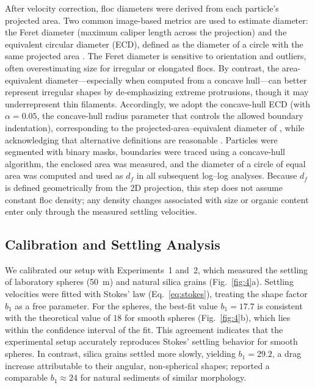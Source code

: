 \documentclass{agujournal2019}
\providecommand{\DIFdel}[1]{{\protect\color{red}\sout{#1}}} %
\providecommand{\DIFdelbegin}{\protect\color{red}} %
\providecommand{\DIFdelend}{\protect\color{black}} %
\newcommand{\DIFscaledelfig}{0.5}
\newlength{\DIFdelgraphicswidth} %
\newlength{\DIFdelgraphicsheight} %
\newcommand{\DIFdelincludegraphics}[2][]{%
\sbox{\DIFdelgraphicsbox}{\DIFOincludegraphics[#1]{#2}}%
\settoboxwidth{\DIFdelgraphicswidth}{\DIFdelgraphicsbox} %
\settoboxtotalheight{\DIFdelgraphicsheight}{\DIFdelgraphicsbox} %
\scalebox{\DIFscaledelfig}{%
\parbox[b]{\DIFdelgraphicswidth}{\usebox{\DIFdelgraphicsbox}\\[-\baselineskip] \rule{\DIFdelgraphicswidth}{0em}}\llap{\resizebox{\DIFdelgraphicswidth}{\DIFdelgraphicsheight}{%
\setlength{\unitlength}{\DIFdelgraphicswidth}%
\begin{picture}(1,1)%
\thicklines\linethickness{2pt} %
{\color[rgb]{1,0,0}\put(0,0){\framebox(1,1){}}}%
{\color[rgb]{1,0,0}\put(0,0){\line( 1,1){1}}}%
{\color[rgb]{1,0,0}\put(0,1){\line(1,-1){1}}}%
\end{picture}%
}\hspace*{3pt}}} %
} %
\DeclareRobustCommand{\DIFdelbegin}{\DIFOdelbegin \let\includegraphics\DIFdelincludegraphics} %
\DeclareRobustCommand{\DIFdelend}{\DIFOaddend \let\includegraphics\DIFOincludegraphics} %
\begin{document}
After velocity correction, floc diameters were derived from each particle's projected area. Two common image-based metrics are used to estimate diameter: the Feret diameter (maximum caliper length across the projection) and the equivalent circular diameter (ECD), defined as the diameter of a circle with the same projected area \cite{jarvis2005measuring, smith2015image}. The Feret diameter is sensitive to orientation and outliers, often overestimating size for irregular or elongated flocs. By contrast, the area-equivalent diameter---especially when computed from a concave hull---can better represent irregular shapes by de-emphasizing extreme protrusions, though it may underrepresent thin filaments. Accordingly, we adopt the concave-hull ECD (with $\alpha = 0.05$, the concave-hull radius parameter that controls the allowed boundary indentation), corresponding to the projected-area--equivalent diameter of , while acknowledging that alternative definitions are reasonable \cite{jarvis2005measuring}. Particles were segmented with binary masks, boundaries were traced using a concave-hull algorithm, the enclosed area was measured, and the diameter of a circle of equal area was computed and used as \(d_f\) in all subsequent log--log analyses. Because $d_f$ is defined geometrically from the 2D projection, this step does not assume constant floc density; any density changes associated with size or organic content enter only through the measured settling velocities.

\subsection{Calibration and Settling \DIFdelbegin \DIFdel{Behavior }\DIFdelend Analysis}

We calibrated our setup with Experiments~1 and~2, which measured the settling of laboratory spheres (50~\textmu m) and natural silica grains (Fig.~\ref{fig:4}a). Settling velocities were fitted with Stokes' law (Eq.~\eqref{eq:stokes}), treating the shape factor $b_1$ as a free parameter. For the spheres, the best-fit value $b_1 = 17.7$ is consistent with the theoretical value of $18$ for smooth spheres (Fig.~\ref{fig:4}b), which lies within the confidence interval of the fit. This agreement indicates that the experimental setup accurately reproduces Stokes' settling behavior for smooth spheres. In contrast, silica grains settled more slowly, yielding $b_1 = 29.2$, a drag increase attributable to their angular, non-spherical shapes;  reported a comparable $b_1 \approx 24$ for natural sediments of similar morphology.
\end{document}
